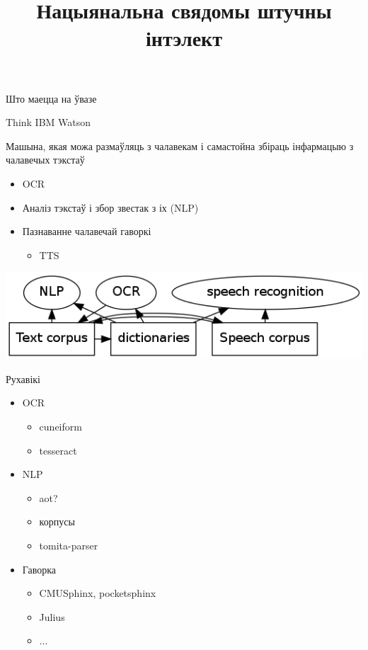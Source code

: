 

\title{Нацыянальна свядомы штучны інтэлект}


\begin{frame}{}
\titlepage
\end{frame}

\begin{frame}{Што маецца на ўвазе}
\begin{center}
{\Large Think IBM Watson}

Машына, якая можа размаўляць з чалавекам і самастойна збіраць інфармацыю з чалавечых тэкстаў
\end{center}
\begin{itemize}
  \item OCR
  \item Аналіз тэкстаў і збор звестак з іх (NLP)
  \item Пазнаванне чалавечай гаворкі 
  \begin{itemize}
    \item TTS
  \end{itemize}
\end{itemize}
  
\end{frame}

\begin{frame}{}
\includegraphics[width=\textwidth]{ai.png}
\end{frame}

\begin{frame}{Рухавікі}
\begin{itemize}
 \item OCR
 \begin{itemize}
  \item cuneiform
  \item tesseract
 \end{itemize}
 \item NLP
 \begin{itemize}
   \item aot?
   \item корпусы
   \item tomita-parser
 \end{itemize}
 \item Гаворка
  \begin{itemize}
   \item CMUSphinx, pocketsphinx
   \item Julius
   \item ...
  \end{itemize}
\end{itemize}
\end{frame}


